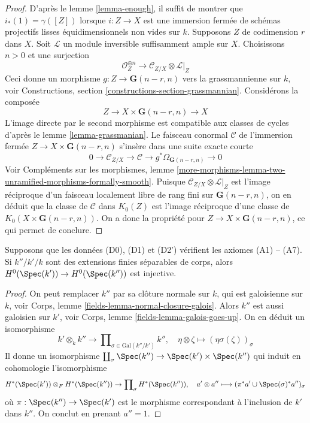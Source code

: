 \begin{proof}
D'après le lemme \ref{lemma-enough}, il suffit de montrer que $i_*(1) = \gamma([Z])$
lorsque $i : Z \to X$ est une immersion fermée de schémas
projectifs lisses équidimensionnels non vides
sur $k$. Supposons $Z$ de codimension $r$ dans $X$.
Soit $\mathcal{L}$ un module inversible suffisamment ample sur $X$.
Choisissons $n > 0$ et une surjection
$$
\mathcal{O}_Z^{\oplus n} \to \mathcal{C}_{Z/X} \otimes \mathcal{L}|_Z
$$
Ceci donne un morphisme $g : Z \to \mathbf{G}(n - r, n)$
vers la grassmannienne sur $k$, voir
Constructions, section \ref{constructions-section-grassmannian}.
Considérons la composée
$$
Z \to X \times \mathbf{G}(n - r, n) \to X
$$
L'image directe par le second morphisme est compatible aux classes
de cycles d'après le lemme \ref{lemma-grassmanian}. Le faisceau conormal $\mathcal{C}$
de l'immersion fermée $Z \to X \times \mathbf{G}(n - r, n)$ s'insère dans
une suite exacte courte
$$
0 \to \mathcal{C}_{Z/X} \to \mathcal{C} \to
g^*\Omega_{\mathbf{G}(n - r, n)} \to 0
$$
Voir Compléments sur les morphismes, lemme
\ref{more-morphisms-lemma-two-unramified-morphisms-formally-smooth}.
Puisque $\mathcal{C}_{Z/X} \otimes \mathcal{L}|_Z$ est l'image
réciproque d'un faisceau localement libre de rang fini sur $\mathbf{G}(n - r, n)$,
on en déduit que la classe de $\mathcal{C}$ dans $K_0(Z)$
est l'image réciproque d'une classe de $K_0(X \times \mathbf{G}(n - r, n))$.
On a donc la propriété pour $Z \to X \times \mathbf{G}(n - r, n)$,
ce qui permet de conclure.
\end{proof}

\begin{lemma}
\label{lemma-injective-H0}
Supposons que les données (D0), (D1) et (D2') vérifient les axiomes (A1) -- (A7).
Si $k''/k'/k$ sont des extensions finies séparables de corps, alors
$H^0(\Spec(k')) \to H^0(\Spec(k''))$ est injective.
\end{lemma}

\begin{proof}
On peut remplacer $k''$ par sa clôture normale sur $k$,
qui est galoisienne sur $k$, voir
Corps, lemme \ref{fields-lemma-normal-closure-galois}.
Alors $k''$ est aussi galoisien sur $k'$, voir
Corps, lemme \ref{fields-lemma-galois-goes-up}.
On en déduit un isomorphisme
$$
k' \otimes_k k'' \longrightarrow
\prod\nolimits_{\sigma \in \text{Gal}(k''/k')} k'',\quad
\eta \otimes \zeta \longmapsto (\eta \sigma(\zeta))_\sigma
$$
Il donne un isomorphisme
$\coprod_\sigma \Spec(k'') \to \Spec(k') \times \Spec(k'')$
qui induit en cohomologie l'isomorphisme
$$
H^*(\Spec(k')) \otimes_F H^*(\Spec(k''))
\to
\prod\nolimits_\sigma H^*(\Spec(k'')),\quad
a' \otimes a'' \longmapsto (\pi^*a' \cup \Spec(\sigma)^*a'')_\sigma
$$
où $\pi : \Spec(k'') \to \Spec(k')$ est le morphisme
correspondant à l'inclusion de $k'$ dans $k''$.
On conclut en prenant $a'' = 1$.
\end{proof}

